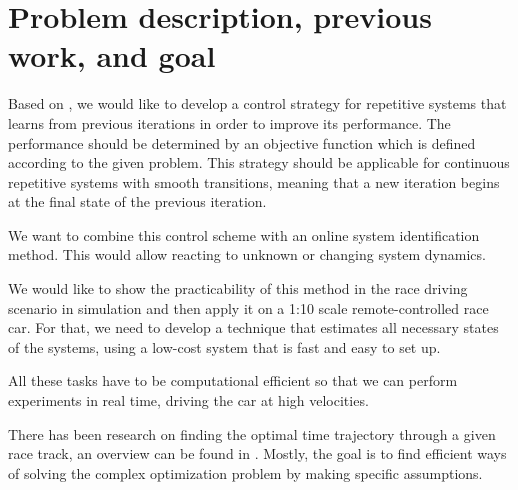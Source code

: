 \section{Problem description, previous work, and goal}
Based on \cite{Rosolia2016}, we would like to develop a control strategy for repetitive systems that learns from previous iterations in order to improve its performance. The performance should be determined by an objective function which is defined according to the given problem. This strategy should be applicable for continuous repetitive systems with smooth transitions, meaning that a new iteration begins at the final state of the previous iteration.

We want to combine this control scheme with an online system identification method. This would allow reacting to unknown or changing system dynamics.

We would like to show the practicability of this method in the race driving scenario in simulation and then apply it on a 1:10 scale remote-controlled race car. For that, we need to develop a technique that estimates all necessary states of the systems, using a low-cost system that is fast and easy to set up.

All these tasks have to be computational efficient so that we can perform experiments in real time, driving the car at high velocities.

There has been research on finding the optimal time trajectory through a given race track, an overview can be found in \cite{Sharp2011}. Mostly, the goal is to find efficient ways of solving the complex optimization problem by making specific assumptions.

